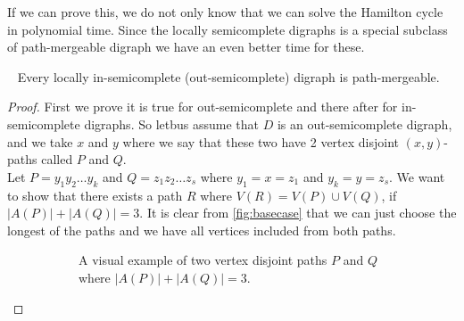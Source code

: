 If we can prove this, we do not only know that we can solve the Hamilton cycle in polynomial time. 
Since the locally semicomplete digraphs is a special subclass of path-mergeable digraph we have an even better time for these.
\begin{prop}~\cite{bangJGT20}
    Every locally in-semicomplete (out-semicomplete) digraph is path-mergeable.
\end{prop}
\begin{proof}
    First we prove it is true for out-semicomplete and there after for in-semicomplete digraphs.
    So letbus assume that $D$ is an out-semicomplete digraph, and we take $x$ and $y$ where we say that these two have 2 vertex disjoint $(x,y)$-paths called $P$ and $Q$.\\
    Let $P=y_1y_2\dots y_k$ and $Q=z_1z_2\dots z_s$ where $y_1=x=z_1$ and $y_k=y=z_s$. We want to show that there exists a path $R$ where $V(R)=V(P)\cup V(Q)$, if $|A(P)|+|A(Q)|=3$. 
    It is clear from \autoref{fig:basecase} that we can just choose the longest of the paths and we have all vertices included from both paths.
    \begin{figure}
        \centering
        \begin{subfigure}{0.36\textwidth}
            \centering
            \caption{A visual example of two vertex disjoint paths $P$ and $Q$ where $|A(P)|+|A(Q)|=3$.}
            \label{fig:basecase}
        \end{subfigure}\hfill
        \begin{subfigure}{0.60\textwidth}
            \centering
\end{subfigure}
\end{figure}
\end{proof}
